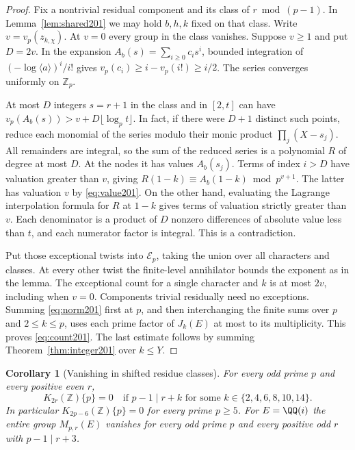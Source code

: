 \documentclass[a4paper,11pt]{article}
\newtheorem{corollary}[proposition]{Corollary}
\theoremstyle{definition}
\theoremstyle{remark}
\newcommand{\ZZ}{\mathbb Z}\newcommand{\ord}{\operatorname{ord}}
\numberwithin{equation}{section}
\begin{document}
\begin{proof}
Fix a nontrivial residual component and its class of \(r\bmod(p-1)\).
In Lemma~\ref{lem:shared201} we may hold \(b,h,k\) fixed on that
class. Write \(v=v_p(z_{k,\chi})\). At \(v=0\) every group in the
class vanishes. Suppose \(v\ge1\) and put \(D=2v\). In the expansion
\(A_b(s)=\sum_{i\ge0}c_i s^i\), bounded integration of
\((-\log\langle a\rangle)^i/i!\) gives \(v_p(c_i)\ge i-v_p(i!)\ge i/2\).
The series converges uniformly on \(\ZZ_p\).

At most \(D\) integers \(s=r+1\) in the class and in \([2,t]\)
can have \(v_p(A_b(s))>v+D\lfloor\log_p t\rfloor\).
In fact, if there were \(D+1\) distinct such points, reduce each
monomial of the series modulo their monic product
\(\prod_j(X-s_j)\). All remainders are integral, so the sum of the
reduced series is a polynomial \(R\) of degree at most \(D\).
At the nodes it has values \(A_b(s_j)\). Terms of index \(i>D\)
have valuation greater than \(v\), giving
\(R(1-k)\equiv A_b(1-k)\bmod p^{v+1}\). The latter has valuation
\(v\) by \eqref{eq:value201}. On the other hand, evaluating
the Lagrange interpolation formula for \(R\) at \(1-k\) gives
terms of valuation strictly greater than \(v\). Each denominator
is a product of \(D\) nonzero differences of absolute value less
than \(t\), and each numerator factor is integral. This is a
contradiction.

Put those exceptional twists into \(\mathcal E_p\), taking the union
over all characters and classes. At every other twist the
finite-level annihilator bounds the exponent as in the lemma.
The exceptional count for a single character and \(k\) is at
most \(2v\), including when \(v=0\). Components trivial residually
need no exceptions. Summing \eqref{eq:norm201} first at \(p\), and
then interchanging the finite sums over \(p\) and \(2\le k\le p\),
uses each prime factor of \(J_k(E)\) at most to its multiplicity.
This proves \eqref{eq:count201}. The last estimate follows by summing
Theorem~\ref{thm:integer201} over \(k\le Y\).
\end{proof}

\begin{corollary}[Vanishing in shifted residue classes]
\label{cor:shared201}
For every odd prime \(p\) and every positive even \(r\),
\[
 K_{2r}(\ZZ)\{p\}=0
 \quad\text{if }p-1\mid r+k
 \text{ for some }k\in\{2,4,6,8,10,14\}.
\]
In particular \(K_{2p-6}(\ZZ)\{p\}=0\) for every prime \(p\ge5\).
For \(E=\QQ(i)\) the entire group \(M_{p,r}(E)\) vanishes for
every odd prime \(p\) and every positive odd \(r\) with \(p-1\mid r+3\).
\end{corollary}
\end{document}
